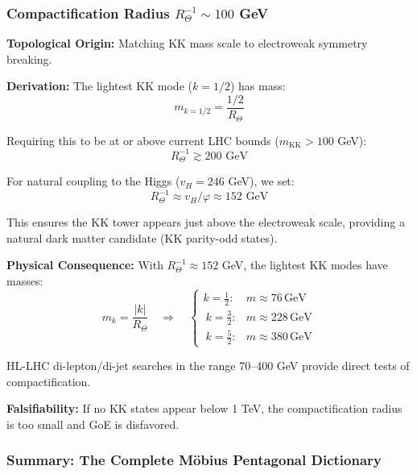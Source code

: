 \documentclass[12pt]{article}
\theoremstyle{definition}
\theoremstyle{plain}
\begin{document}
\subsubsection{Compactification Radius $R_\Theta^{-1} \sim 100$ GeV}

\textbf{Topological Origin:} Matching KK mass scale to electroweak symmetry breaking.

\textbf{Derivation:} The lightest KK mode ($k = 1/2$) has mass:
\begin{equation}
m_{k=1/2} = \frac{1/2}{R_\Theta}
\end{equation}

Requiring this to be at or above current LHC bounds ($m_{\text{KK}} > 100$ GeV):
\begin{equation}
R_\Theta^{-1} \gtrsim 200 \text{ GeV}
\end{equation}

For natural coupling to the Higgs ($v_H = 246$ GeV), we set:
\begin{equation}
R_\Theta^{-1} \approx v_H / \varphi \approx 152 \text{ GeV}
\end{equation}

This ensures the KK tower appears just above the electroweak scale, providing a natural dark matter candidate (KK parity-odd states).

\textbf{Physical Consequence:} With $R_\Theta^{-1} \approx 152$ GeV, the lightest KK modes have masses:
\begin{equation}
m_k = \frac{|k|}{R_\Theta} \quad \Rightarrow \quad \begin{cases}
k = \tfrac{1}{2}: & m \approx 76\,\text{GeV} \\\
k = \tfrac{3}{2}: & m \approx 228\,\text{GeV} \\\
k = \tfrac{5}{2}: & m \approx 380\,\text{GeV}
\end{cases}
\end{equation}

HL-LHC di-lepton/di-jet searches in the range 70–400 GeV provide direct tests of compactification.

\textbf{Falsifiability:} If no KK states appear below 1 TeV, the compactification radius is too small and GoE is disfavored.

\subsubsection{Summary: The Complete M\"obius Pentagonal Dictionary}
\end{document}
